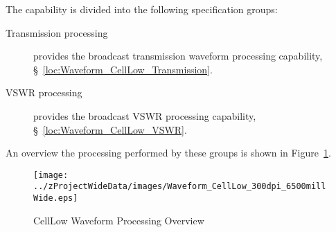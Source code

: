The \ThisSys \ThisSegment \CellLow capability is divided into the following specification groups:
\begin{description}
	\item[Transmission processing] provides the \CellLow broadcast transmission waveform processing capability, \S~\ref{loc:Waveform_CellLow_Transmission}.
	\item[VSWR processing]  provides the \CellLow broadcast VSWR processing capability, \S~\ref{loc:Waveform_CellLow_VSWR}.
\end{description}
An overview the processing performed by these groups is shown in Figure~\ref{fig:CellLow_Waveform_Processing}.
\begin{figure}[htbp]
	\centering
		\texttt{[image: ../zProjectWideData/images/Waveform\_CellLow\_300dpi\_6500millWide.eps]}
	\caption[CellLow Waveform Processing Overview]{CellLow Waveform Processing Overview}
	\label{fig:CellLow_Waveform_Processing}
\end{figure}

%
%
%

